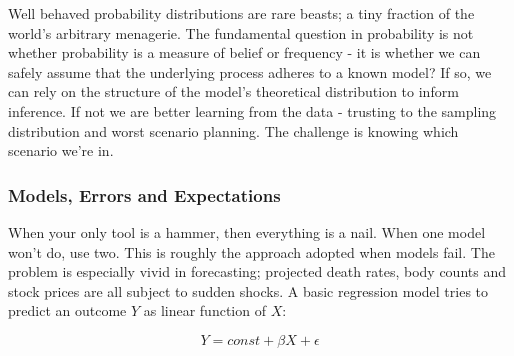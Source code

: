\documentclass[10pt,a4paper,notitlepage, twocolumn]{article}
\begin{document}
Well behaved probability distributions are rare beasts; a tiny fraction of the world's arbitrary menagerie. The fundamental question in probability is not whether probability is a measure of belief or frequency - it is whether we can safely assume that the underlying process adheres to a known model? If so, we can rely on the structure of the model's theoretical distribution to inform inference. If not we are better learning from the data - trusting to the sampling distribution and worst scenario planning. The challenge is knowing which scenario we're in.

\subsubsection*{Models, Errors and Expectations}
When your only tool is a hammer, then everything is a nail. When one model won't do, use two. This is roughly the approach adopted when models fail. The problem is especially vivid in forecasting; projected death rates, body counts and stock prices are all subject to sudden shocks. A basic regression model tries to predict an outcome $Y$ as linear function of $X$:

$$ Y = const + \beta X + \epsilon $$
\end{document}
